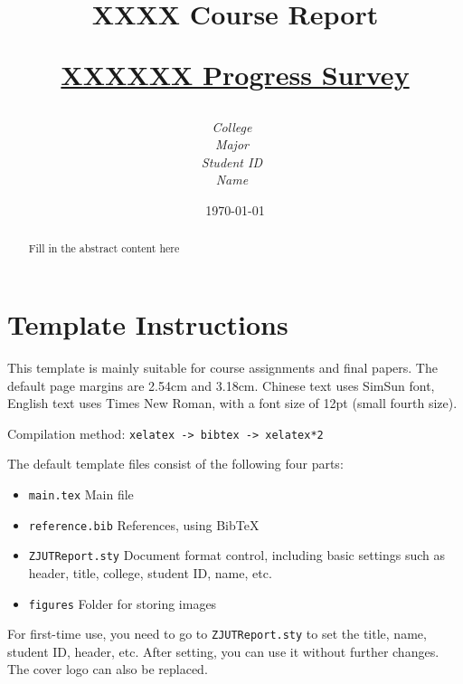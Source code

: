 \documentclass[12pt,a4paper]{article}
\title{ 
        \vspace{1cm}
        \sffamily\bfseries \Huge \textbf{{XXXX Course Report}} \par
        \vspace{1cm} 
        \sffamily\bfseries \Large {\underline{XXXXXX Progress Survey}}    
        \vspace{3cm}
    }
\author{
        \vspace{0.5cm}
        \itshape\Large College\ \dlmu[9cm]{College of Computer Science} \\ %
        \vspace{0.5cm}
        \itshape\Large Major\ \dlmu[9cm]{Computer Science and Technology} \\ %
        \vspace{0.5cm}
        \itshape\Large Student ID\ \dlmu[9cm]{2023XXXXXX} \qquad  \\ %
        \vspace{0.5cm}
        \itshape\Large Name\ \dlmu[9cm]{XXX} \qquad \\ %
    }
\date{\today} %
\begin{document}
\cover
\thispagestyle{empty} %
\newpage
\begin{abstract}

Fill in the abstract content here

\end{abstract}

\thispagestyle{empty} %

\newpage
\tableofcontents

\newpage
\setcounter{page}{1} %


\section{Template Instructions}
This template is mainly suitable for course assignments and final papers. The default page margins are 2.54cm and 3.18cm. Chinese text uses SimSun font, English text uses Times New Roman, with a font size of 12pt (small fourth size).

Compilation method: \verb|xelatex -> bibtex -> xelatex*2|


The default template files consist of the following four parts:
\begin{itemize}
    \item \texttt{main.tex} Main file
    \item \texttt{reference.bib} References, using BibTeX
    \item \texttt{ZJUTReport.sty} Document format control, including basic settings such as header, title, college, student ID, name, etc.
    \item \texttt{figures} Folder for storing images
\end{itemize}

For first-time use, you need to go to \texttt{ZJUTReport.sty} to set the title, name, student ID, header, etc. After setting, you can use it without further changes. The cover logo can also be replaced.
\end{document}
